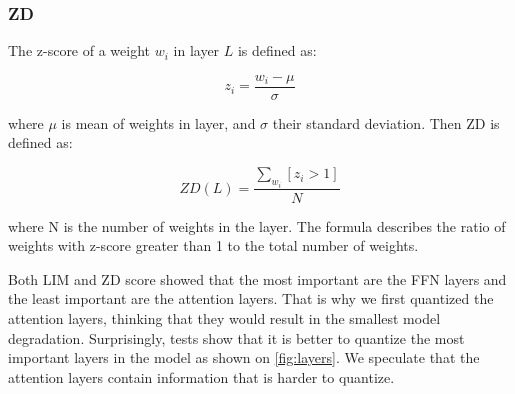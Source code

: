 \documentclass{article}
\begin{document}
\subsubsection{ZD}

The z-score of a weight \(w_i\) in layer \(L\) is defined as:

\begin{equation*}
    z_i = \frac{w_i - \mu}{\sigma}
\end{equation*}

where \(\mu\) is mean of weights in layer, and \(\sigma\) their standard deviation. Then ZD is defined as:

\begin{equation*}
    ZD(L) = \frac{\sum_{w_i} [z_i > 1]}{N}
\end{equation*}

where N is the number of weights in the layer. The formula describes the ratio of weights with z-score greater than 1 to the total number of weights.

Both LIM and ZD score showed that the most important are the FFN layers and the least important are the attention layers. That is why we first quantized the attention layers, thinking that they would result in the smallest model degradation. Surprisingly, tests show that it is better to quantize the most important layers in the model as shown on \ref{fig:layers}. We speculate that the attention layers contain information that is harder to quantize.
\end{document}
